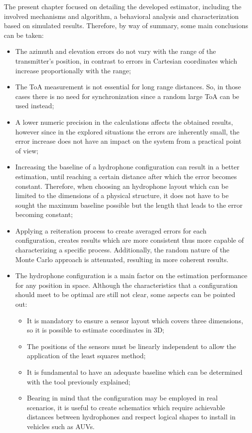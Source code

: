 The present chapter focused on detailing the developed estimator, including the involved mechanisms and algorithm, a behavioral analysis and characterization based on simulated results. Therefore, by way of summary, some main conclusions can be taken:
\begin{itemize}
	\item The azimuth and elevation errors do not vary with the range of the transmitter's position, in contrast to errors in Cartesian coordinates which increase proportionally with the range;
	
	\item The ToA measurement is not essential for long range distances. So, in those cases there is no need for synchronization since a random large ToA can be used instead;
	
	\item A lower numeric precision in the calculations affects the obtained results, however since in the explored situations the errors are inherently small, the error increase does not have an impact on the system from a practical point of view;
	
	\item Increasing the baseline of a hydrophone configuration can result in a better estimation, until reaching a certain distance after which the error becomes constant. Therefore, when choosing an hydrophone layout which can be limited to the dimensions of a physical structure, it does not have to be sought the maximum baseline possible but the length that leads to the error becoming constant;
	
	\item Applying a reiteration process to create averaged errors for each configuration, creates results which are more consistent thus more capable of characterizing a specific process. Additionally, the random nature of the Monte Carlo approach is attenuated, resulting in more coherent results.
	
	\item The hydrophone configuration is a main factor on the estimation performance for any position in space. Although the characteristics that a configuration should meet to be optimal are still not clear, some aspects can be pointed out: 
	
	\begin{itemize}
		\item It is mandatory to ensure a sensor layout which covers three dimensions, so it is possible to estimate coordinates in 3D;
		\item The positions of the sensors must be linearly independent to allow the application of the least squares method;
		\item It is fundamental to have an adequate baseline which can be determined with the tool previously explained;
		\item Bearing in mind that the configuration may be employed in real scenarios, it is useful to create schematics which require achievable distances between hydrophones and respect logical shapes to install in vehicles such as AUVs.
	\end{itemize}
\end{itemize}

